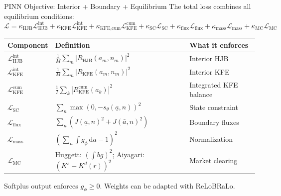 \documentclass[aspectratio=169,11pt]{beamer}
\newcommand{\emphc}[1]{\textcolor{harvardcrimson}{#1}}
\newcommand{\ud}{\,\mathrm{d}}
\newcommand{\ubar}[1]{\underline{#1}}
\begin{document}
\begin{frame}[shrink=5]{PINN Objective: Interior + Boundary + Equilibrium}
\small
The total loss combines \emphc{all equilibrium conditions}:
\[
\boxed{
\mathcal{L}=
\kappa_{\text{HJB}}\mathcal{L}_{\text{HJB}}^{\text{int}}
+\kappa_{\text{KFE}}\mathcal{L}_{\text{KFE}}^{\text{int}}
+\kappa_{\text{KFE,cum}}\mathcal{L}_{\text{KFE}}^{\text{cum}}
+\kappa_{\text{SC}}\mathcal{L}_{\text{SC}}
+\kappa_{\text{flux}}\mathcal{L}_{\text{flux}}
+\kappa_{\text{mass}}\mathcal{L}_{\text{mass}}
+\kappa_{\text{MC}}\mathcal{L}_{\text{MC}}
}
\]

\vspace{0.1em}
\begin{center}
\scriptsize
\renewcommand{\arraystretch}{1.25}
\begin{tabular}{lll}
\toprule
\textbf{Component} & \textbf{Definition} & \textbf{What it enforces} \\
\midrule
$\mathcal{L}_{\text{HJB}}^{\text{int}}$ & $\frac{1}{M}\sum_m |R_{\text{HJB}}(a_m,n_m)|^2$ & Interior HJB \\[2pt]
$\mathcal{L}_{\text{KFE}}^{\text{int}}$ & $\frac{1}{M}\sum_m |R_{\text{KFE}}(a_m,n_m)|^2$ & Interior KFE \\[2pt]
$\mathcal{L}_{\text{KFE}}^{\text{cum}}$ & $\frac{1}{I}\sum_k |R_{\text{KFE}}^{\text{cum}}(a_k)|^2$ & Integrated KFE balance \\[2pt]
$\mathcal{L}_{\text{SC}}$ & $\sum_n\max(0,-s_\theta(\ubar a,n))^2$ & State constraint \\[2pt]
$\mathcal{L}_{\text{flux}}$ & $\sum_n(J(\ubar a,n)^2+J(\bar a,n)^2)$ & Boundary fluxes \\[2pt]
$\mathcal{L}_{\text{mass}}$ & $\left(\sum_n\int g_\phi\ud a-1\right)^2$ & Normalization \\[2pt]
$\mathcal{L}_{\text{MC}}$ & Huggett: $(\int b g)^2$; Aiyagari: $(K^s-K^d(r))^2$ & Market clearing \\
\bottomrule
\end{tabular}
\end{center}

\vspace{0.1em}
Softplus output enforces $g_\phi\ge 0$. Weights can be adapted with ReLoBRaLo.
\end{frame}
\end{document}
